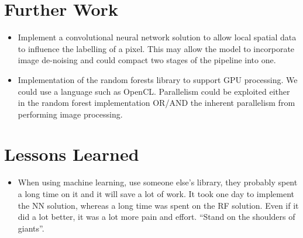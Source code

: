 \documentclass[12pt,twoside,notitlepage]{report}
\begin{document}
    \section{Further Work}
        \begin{itemize}
            \item Implement a convolutional neural network solution to allow local spatial data to influence the labelling of a pixel. This may allow the model to incorporate image de-noising and could compact two stages of the pipeline into one.
            \item Implementation of the random forests library to support GPU processing. We could use a language such as OpenCL. Parallelism could be exploited either in the random forest implementation OR/AND the inherent parallelism from performing image processing.
        \end{itemize}

    \section{Lessons Learned}
        \begin{itemize}
            \item When using machine learning, use someone else's library, they probably spent a long time on it
                and it will save a lot of work. It took one day to implement the NN solution, whereas a long time 
                was spent on the RF solution. Even if it did a lot better, it was a lot more pain and effort. 
                ``Stand on the shoulders of giants''.
        \end{itemize}











\cleardoublepage
{}

\cleardoublepage
\end{document}
